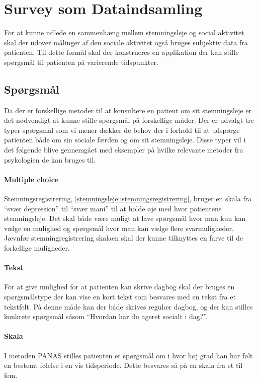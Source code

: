 \section{Survey som Dataindsamling}
For at kunne udlede en sammenhæng mellem stemningsleje og social aktivitet skal der udover målinger af den sociale aktivitet også bruges subjektiv data fra patienten.
Til dette formål skal der konstrueres en applikation der kan stille spørgsmål til patienten på varierende tidspunkter.

\subsection{Spørgsmål}\label{survey:spg}
Da der er forskellige metoder til at konsultere en patient om sit stemningsleje er det nødvendigt at kunne stille spørgsmål på forskellige måder.
Der er udvalgt tre typer spørgsmål som vi mener dækker de behov der i forhold til at udspørge patienten både om sin sociale færden og om sit stemningsleje.
Disse typer vil i det følgende blive gennemgået med eksempler på hvilke relevante metoder fra psykologien de kan bruges til.

\paragraph{Multiple choice}
Stemningsregistrering, \cref{stemningsleje::stemningsregistrering}, bruger en skala fra ``svær depression'' til ``svær mani'' til at holde øje med hvor patientens stemningsleje.
Det skal både være muligt at lave spørgsmål hvor man kun kan vælge en mulighed og spørgsmål hvor man kan vælge flere svarmuligheder.
Jævnfør stemningregistrering skalaen skal der kunne tilknyttes en farve til de forkellige muligheder.


\paragraph{Tekst}
For at give mulighed for at patienten kan skrive dagbog  skal der bruges en spørgsmålstype der kan vise en kort tekst som besvares med en tekst fra et tekstfelt.
På denne måde kan der både skrives regulær dagbog, og der kan stilles konkrete spørgsmål såsom ``Hvordan har du ageret socialt i dag?''.

\paragraph{Skala}
I metoden PANAS stilles patienten et spørgsmål om i hvor høj grad han har følt en bestemt følelse i en vis tidsperiode.
Dette besvares så på en skala fra et til fem.

